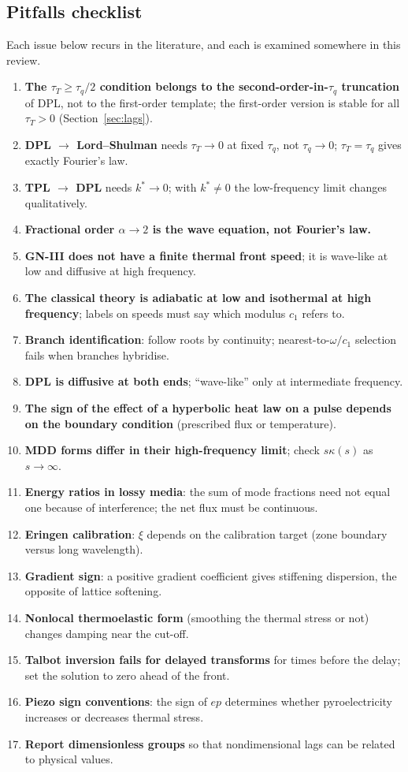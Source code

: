 \subsection{Pitfalls checklist}
Each issue below recurs in the literature, and each is examined somewhere in this review.
\begin{enumerate}
\item \textbf{The $\tau_T\ge\tau_q/2$ condition belongs to the second-order-in-$\tau_q$ truncation} of DPL, not to the first-order template; the first-order version is stable for all $\tau_T>0$ (Section~\ref{sec:lags}).
\item \textbf{DPL $\to$ Lord--Shulman} needs $\tau_T\to0$ at fixed $\tau_q$, not $\tau_q\to0$; $\tau_T=\tau_q$ gives exactly Fourier's law.
\item \textbf{TPL $\to$ DPL} needs $k^*\to0$; with $k^*\ne0$ the low-frequency limit changes qualitatively.
\item \textbf{Fractional order $\alpha\to2$ is the wave equation, not Fourier's law.}
\item \textbf{GN-III does not have a finite thermal front speed}; it is wave-like at low and diffusive at high frequency.
\item \textbf{The classical theory is adiabatic at low and isothermal at high frequency}; labels on speeds must say which modulus $c_1$ refers to.
\item \textbf{Branch identification}: follow roots by continuity; nearest-to-$\omega/c_1$ selection fails when branches hybridise.
\item \textbf{DPL is diffusive at both ends}; ``wave-like'' only at intermediate frequency.
\item \textbf{The sign of the effect of a hyperbolic heat law on a pulse depends on the boundary condition} (prescribed flux or temperature).
\item \textbf{MDD forms differ in their high-frequency limit}; check $s\kappa(s)$ as $s\to\infty$.
\item \textbf{Energy ratios in lossy media}: the sum of mode fractions need not equal one because of interference; the net flux must be continuous.
\item \textbf{Eringen calibration}: $\xi$ depends on the calibration target (zone boundary versus long wavelength).
\item \textbf{Gradient sign}: a positive gradient coefficient gives stiffening dispersion, the opposite of lattice softening.
\item \textbf{Nonlocal thermoelastic form} (smoothing the thermal stress or not) changes damping near the cut-off.
\item \textbf{Talbot inversion fails for delayed transforms} for times before the delay; set the solution to zero ahead of the front.
\item \textbf{Piezo sign conventions}: the sign of $ep$ determines whether pyroelectricity increases or decreases thermal stress.
\item \textbf{Report dimensionless groups} so that nondimensional lags can be related to physical values.
\end{enumerate}

